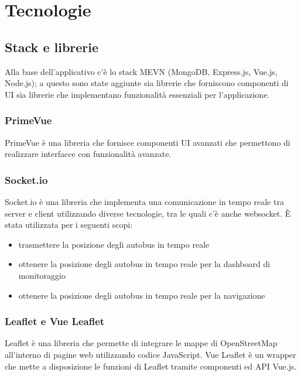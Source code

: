 \section{Tecnologie}

\subsection{Stack e librerie}

Alla base dell'applicativo c'è lo stack MEVN (MongoDB, Express.js, Vue.js, Node.js); a questo sono state aggiunte sia librerie che forniscono componenti di UI sia librerie che implementano funzionalità essenziali per l'applicazione.

\subsubsection{PrimeVue}

PrimeVue è una libreria che fornisce componenti UI avanzati che permettono di realizzare interfacce con funzionalità avanzate.

\subsubsection{Socket.io}

Socket.io è una libreria che implementa una comunicazione in tempo reale tra server e client utilizzando diverse tecnologie, tra le quali c'è anche websocket. È stata utilizzata per i seguenti scopi:
\begin{itemize}
    \item trasmettere la posizione degli autobus in tempo reale
    \item ottenere la posizione degli autobus in tempo reale per la dashboard di monitoraggio
    \item ottenere la posizione degli autobus in tempo reale per la navigazione
\end{itemize}
\iffalse TODO: verificare e/o modificare lista \fi

\subsubsection{Leaflet e Vue Leaflet}

Leaflet è una libreria che permette di integrare le mappe di OpenStreetMap all'interno di pagine web utilizzando codice JavaScript. Vue Leaflet è un wrapper che mette a disposizione le funzioni di Leaflet tramite componenti ed API Vue.js.

